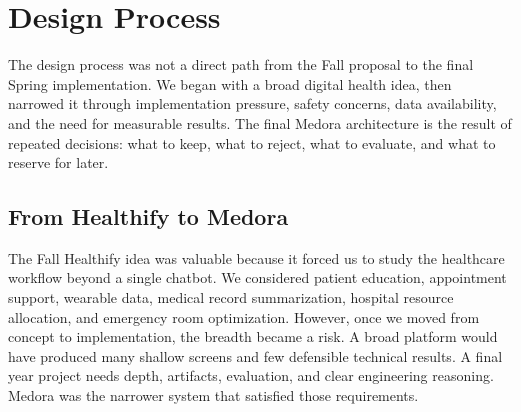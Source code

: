 
\chapter{Design Process}
\label{chapter:design_process}

The design process was not a direct path from the Fall proposal to the final Spring implementation. We began with a broad digital health idea, then narrowed it through implementation pressure, safety concerns, data availability, and the need for measurable results. The final Medora architecture is the result of repeated decisions: what to keep, what to reject, what to evaluate, and what to reserve for later.

\section{From Healthify to Medora}

The Fall Healthify idea was valuable because it forced us to study the healthcare workflow beyond a single chatbot. We considered patient education, appointment support, wearable data, medical record summarization, hospital resource allocation, and emergency room optimization. However, once we moved from concept to implementation, the breadth became a risk. A broad platform would have produced many shallow screens and few defensible technical results. A final year project needs depth, artifacts, evaluation, and clear engineering reasoning. Medora was the narrower system that satisfied those requirements.

